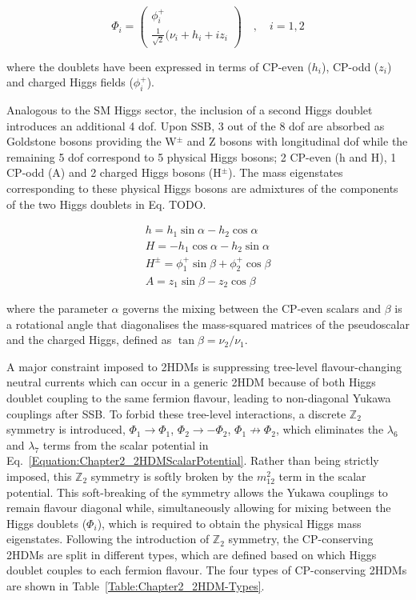 \begin{equation}
    \Phi_i = \begin{pmatrix}
        \phi_i^+ \\
        \frac{1}{\sqrt{2}}(\nu_i + h_i + iz_i
    \end{pmatrix} \quad,\quad i=1,2
\end{equation}

where the doublets have been expressed in terms of CP-even ($h_i$), CP-odd ($z_i$) and charged Higgs fields ($\phi_i^+$).

Analogous to the SM Higgs sector, the inclusion of a second Higgs doublet introduces an additional 4 dof. Upon SSB, 3 out of the 8 dof are absorbed as Goldstone bosons providing the W$^{\pm}$ and Z bosons with longitudinal dof while the remaining 5 dof correspond to 5 physical Higgs bosons; 2 CP-even (h and H), 1 CP-odd (A) and 2 charged Higgs bosons (H$^{\pm}$). The mass eigenstates corresponding to these physical Higgs bosons are admixtures of the components of the two Higgs doublets in Eq. TODO.

\begin{equation}
\begin{array}{c}
     h = h_1 \sin{\alpha} - h_2 \cos{\alpha} \\
     H = - h_1 \cos{\alpha} - h_2 \sin{\alpha} \\
     H^\pm = \phi_1^+ \sin{\beta} + \phi_2^+ \cos{\beta} \\
     A = z_1 \sin{\beta} - z_2 \cos{\beta}
\end{array}
\end{equation}

where the parameter $\alpha$ governs the mixing between the CP-even scalars and $\beta$ is a rotational angle that diagonalises the mass-squared matrices of the pseudoscalar and the charged Higgs, defined as $\tan{\beta} = \nu_2/\nu_1$.

A major constraint imposed to 2HDMs is suppressing tree-level flavour-changing neutral currents which can occur in a generic 2HDM because of both Higgs doublet coupling to the same fermion flavour, leading to non-diagonal Yukawa couplings after SSB. To forbid these tree-level interactions, a discrete $\mathbb{Z}_2$ symmetry \cite{2HDM(2)} is introduced, $\Phi_1 \to \Phi_1$, $\Phi_2 \to - \Phi_2$, $\Phi_1 \not\to \Phi_2$, which eliminates the $\lambda_6$ and $\lambda_7$ terms from the scalar potential in Eq.~\ref{Equation:Chapter2_2HDMScalarPotential}. Rather than being strictly imposed, this $\mathbb{Z}_2$ symmetry is softly broken by the $m_{12}^2$ term in the scalar potential. This soft-breaking of the symmetry allows the Yukawa couplings to remain flavour diagonal while, simultaneously allowing for mixing between the Higgs doublets ($\Phi_i$), which is required to obtain the physical Higgs mass eigenstates. Following the introduction of $\mathbb{Z}_2$ symmetry, the CP-conserving 2HDMs are split in different types, which are defined based on which Higgs doublet couples to each fermion flavour. The four types of CP-conserving 2HDMs are shown in Table~\ref{Table:Chapter2_2HDM-Types}.

